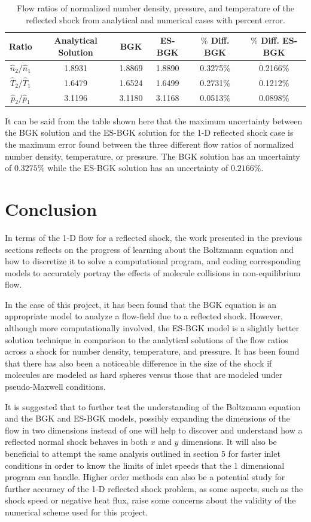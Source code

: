 \documentclass[a4paper]{article}
\begin{document}
\begin{table}[h]
\centering
\begin{tabular}{ |c|c|c|c|c|c| } 
\hline
 Ratio & Analytical Solution & BGK & ES-BGK & $\%$ Diff. BGK & $\%$ Diff. ES-BGK \\
\hline
$\hat{n}_2/\hat{n}_1$ & 1.8931 & 1.8869 & 1.8890 & 0.3275$\%$ & 0.2166$\%$ \\
$\hat{T}_2/\hat{T}_1$ & 1.6479 & 1.6524 & 1.6499 & 0.2731$\%$ & 0.1212$\%$ \\
$\hat{p}_2/\hat{p}_1$ & 3.1196 & 3.1180 & 3.1168 & 0.0513$\%$ & 0.0898$\%$ \\
\hline
\end{tabular}
\caption{\centering Flow ratios of normalized number density, pressure, and temperature of the reflected shock from analytical and numerical cases with percent error.}
\label{flow table error}
\end{table}
It can be said from the table shown here that the maximum uncertainty between the BGK solution and the ES-BGK solution for the 1-D reflected shock case is the maximum error found between the three different flow ratios of normalized number density, temperature, or pressure. The BGK solution has an uncertainty of $0.3275\%$ while the ES-BGK solution has an uncertainty of $0.2166\%$. 

\section{Conclusion}

In terms of the 1-D flow for a reflected shock, the work presented in the previous sections reflects on the progress of learning about the Boltzmann equation and how to discretize it to solve a computational program, and coding corresponding models to accurately portray the effects of molecule collisions in non-equilibrium flow. 

In the case of this project, it has been found that the BGK equation is an appropriate model to analyze a flow-field due to a reflected shock. However, although more computationally involved, the ES-BGK model is a slightly better solution technique in comparison to the analytical solutions of the flow ratios across a shock for number density, temperature, and pressure. It has been found that there has also been a noticeable difference in the size of the shock if molecules are modeled as hard spheres versus those that are modeled under pseudo-Maxwell conditions. 

It is suggested that to further test the understanding of the Boltzmann equation and the BGK and ES-BGK models, possibly expanding the dimensions of the flow in two dimensions instead of one will help to discover and understand how a reflected normal shock behaves in both $x$ and $y$ dimensions. It will also be beneficial to attempt the same analysis outlined in section 5 for faster inlet conditions in order to know the limits of inlet speeds that the 1 dimensional program can handle. Higher order methods can also be a potential study for further accuracy of the 1-D reflected shock problem, as some aspects, such as the shock speed or negative heat flux, raise some concerns about the validity of the numerical scheme used for this project. 
\end{document}
